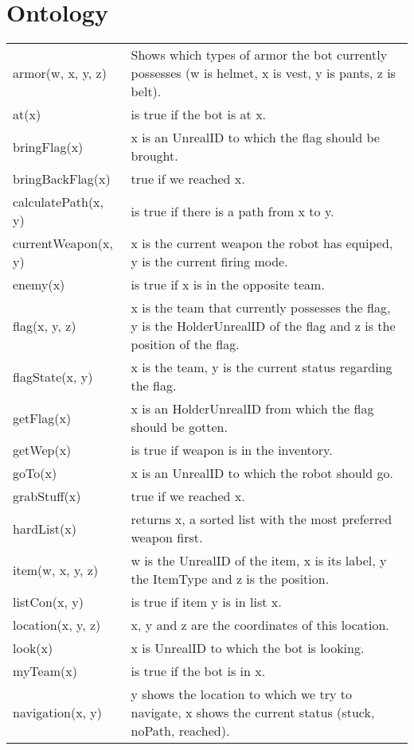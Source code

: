 \chapter{Ontology}
\begin{tabular}{ l | p{12cm}}
  armor(w, x, y, z) & Shows which types of armor the bot currently possesses (w is helmet, x is vest, y is pants, z is belt). \\
  at(x) & is true if the bot is at x. \\
  bringFlag(x) & x is an UnrealID to which the flag should be brought. \\
  bringBackFlag(x) & true if we reached x. \\
  calculatePath(x, y) & is true if there is a path from x to y. \\
  currentWeapon(x, y) & x is the current weapon the robot has equiped, y is the current firing mode. \\
  enemy(x) & is true if x is in the opposite team. \\
  flag(x, y, z) & x is the team that currently possesses the flag, y is the HolderUnrealID of the flag and z is the position of the flag. \\
  flagState(x, y) & x is the team, y is the current status regarding the flag. \\
  getFlag(x) & x is an HolderUnrealID from which the flag should be gotten. \\
  getWep(x) & is true if weapon is in the inventory. \\
  goTo(x) & x is an UnrealID to which the robot should go. \\
  grabStuff(x) & true if we reached x. \\
  hardList(x) & returns x, a sorted list with the most preferred weapon first. \\
  item(w, x, y, z) & w is the UnrealID of the item, x is its label, y the ItemType and z is the position. \\
  listCon(x, y) & is true if item y is in list x. \\
  location(x, y, z) & x, y and z are the coordinates of this location. \\
  look(x) & x is UnrealID to which the bot is looking. \\
  myTeam(x) & is true if the bot is in x. \\
  navigation(x, y) & y shows the location to which we try to navigate, x shows the current status (stuck, noPath, reached). \\

\end{tabular}
